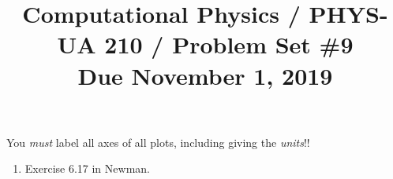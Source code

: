 \documentclass[11pt, preprint]{aastex}
\begin{document}
\title{\bf Computational Physics / PHYS-UA 210 / Problem Set \#9
\\ Due November 1, 2019 }

You {\it must} label all axes of all plots, including giving the {\it
  units}!!

\begin{enumerate} 
\item Exercise 6.17 in Newman. 
\end{enumerate} 
\end{document}
